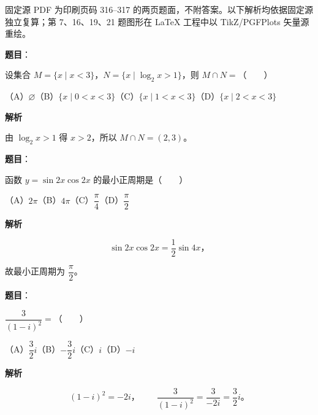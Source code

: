 

\begin{gktip}
固定源 PDF 为印刷页码 316–317 的两页题面，不附答案。以下解析均依据固定源独立复算；第 7、16、19、21 题图形在 LaTeX 工程中以 TikZ/PGFPlots 矢量源重绘。
\end{gktip}

\begin{answer}

\textbf{题目}：

设集合 $M=\{x\mid x<3\}$，$N=\{x\mid\log_2x>1\}$，则 $M\cap N=$\mbox{（　　）}

（A）$\varnothing$\quad（B）$\{x\mid0<x<3\}$\quad（C）$\{x\mid1<x<3\}$\quad（D）$\{x\mid2<x<3\}$

\textbf{解析}

由 $\log_2x>1$ 得 $x>2$，所以 $M\cap N=(2,3)$。


\end{answer}
\begin{answer}

\textbf{题目}：

函数 $y=\sin2x\cos2x$ 的最小正周期是\mbox{（　　）}

（A）$2\pi$\quad（B）$4\pi$\quad（C）$\dfrac\pi4$\quad（D）$\dfrac\pi2$

\textbf{解析}

\nopagebreak[4]
\[
\sin2x\cos2x=\frac12\sin4x\text{，}
\]

故最小正周期为 $\dfrac\pi2$。


\end{answer}
\begin{answer}

\textbf{题目}：

$\dfrac{3}{(1-i)^2}=$\mbox{（　　）}

（A）$\dfrac32i$\quad（B）$-\dfrac32i$\quad（C）$i$\quad（D）$-i$

\textbf{解析}

\nopagebreak[4]
\[
(1-i)^2=-2i\text{，}\qquad \frac3{(1-i)^2}=\frac3{-2i}=\frac32i\text{。}
\]


\end{answer}
